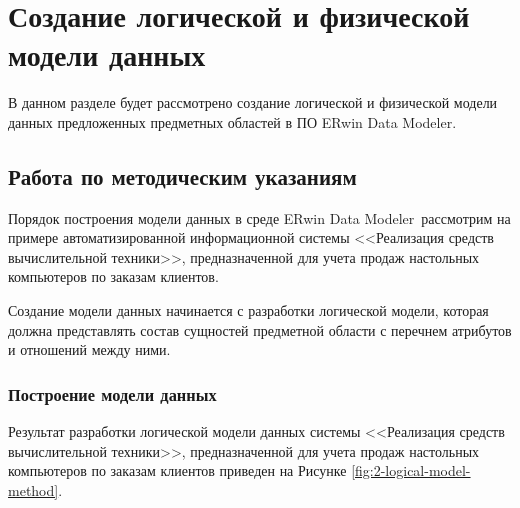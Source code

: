 \newcommand{\erdatamodaler}{ERwin Data Modeler~}

\chapter{Создание логической и физической модели данных}
\label{cha:dmd}
В данном разделе будет рассмотрено создание логической и физической модели данных предложенных предметных областей в ПО ERwin Data Modeler.

%
%

\section{Работа по методическим указаниям}

Порядок построения модели данных в среде \erdatamodaler рассмотрим на примере
автоматизированной информационной системы <<Реализация средств вычислительной
техники>>, предназначенной для учета продаж настольных компьютеров по заказам
клиентов.

Создание модели данных начинается с разработки логической модели, которая
должна представлять состав сущностей предметной области с перечнем атрибутов и
отношений между ними.

\subsection{Построение модели данных}
Результат разработки логической модели данных системы <<Реализация средств
вычислительной техники>>, предназначенной для учета продаж настольных
компьютеров по заказам клиентов приведен на Рисунке \ref{fig:2-logical-model-method}.

